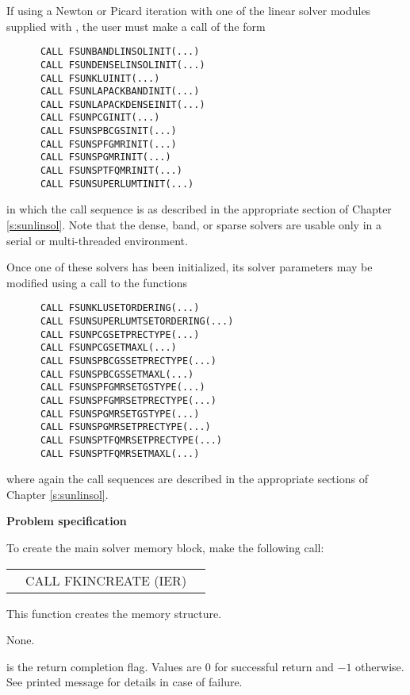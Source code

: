 \begin{Steps}
  If using a Newton or Picard iteration with one of the {\sunlinsol} linear
  solver modules supplied with {\sundials}, the user must make a call
  of the form 
\begin{verbatim}
      CALL FSUNBANDLINSOLINIT(...)
      CALL FSUNDENSELINSOLINIT(...)
      CALL FSUNKLUINIT(...)
      CALL FSUNLAPACKBANDINIT(...)
      CALL FSUNLAPACKDENSEINIT(...)
      CALL FSUNPCGINIT(...)
      CALL FSUNSPBCGSINIT(...)
      CALL FSUNSPFGMRINIT(...)
      CALL FSUNSPGMRINIT(...)
      CALL FSUNSPTFQMRINIT(...)
      CALL FSUNSUPERLUMTINIT(...)
\end{verbatim}
in which the call sequence is as described in the appropriate
section of Chapter \ref{s:sunlinsol}.  Note that the dense, band, or
sparse solvers are usable only in a serial or multi-threaded
environment.

Once one of these solvers has been initialized, its solver parameters may be
modified using a call to the functions
\begin{verbatim}
      CALL FSUNKLUSETORDERING(...)
      CALL FSUNSUPERLUMTSETORDERING(...)
      CALL FSUNPCGSETPRECTYPE(...)
      CALL FSUNPCGSETMAXL(...)
      CALL FSUNSPBCGSSETPRECTYPE(...)
      CALL FSUNSPBCGSSETMAXL(...)
      CALL FSUNSPFGMRSETGSTYPE(...)
      CALL FSUNSPFGMRSETPRECTYPE(...)
      CALL FSUNSPGMRSETGSTYPE(...)
      CALL FSUNSPGMRSETPRECTYPE(...)
      CALL FSUNSPTFQMRSETPRECTYPE(...)
      CALL FSUNSPTFQMRSETMAXL(...)
\end{verbatim}
where again the call sequences are described in the appropriate
sections of Chapter \ref{s:sunlinsol}.

\item {\bf Problem specification}

  To create the main solver memory block, make the following call:
  {
    \begin{tabular}[t]{@{}r@{}l@{}l@{}}
        &CALL FKINCREATE (IER)
    \end{tabular}
  }
  {
    This function creates the {\kinsol} memory structure.
  }
  {
    \begin{args}[IOUT\,]
    \item[None.]
    \end{args}
  }
  {
     is the return completion flag. Values are $0$ for successful return
    and $-1$ otherwise. See printed message for details in case of failure.
  }
  {
  }


\end{Steps}
